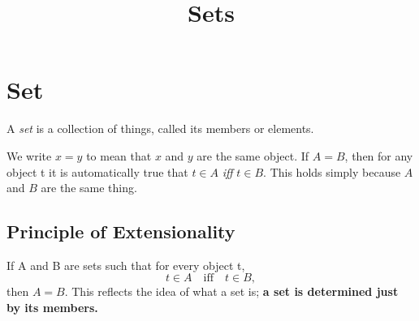 \documentclass[a4paper,12pt]{article}
\title{Sets}
\begin{document}
\section{Set} %
\label{sec:Set}

A \textit{set} is a collection of things, called its members or elements. \newline

We write $x = y$ to mean that $x$ and $y$ are the same object. If $A = B$, then for any object t it is automatically true that $t \in A$ \textit{iff} $t \in B$. This holds simply because $A$ and $B$ are the same thing.

\subsection{Principle of Extensionality} %
\label{sub:Principle of Extensionality}

If A and B are sets such that for every object t, $$t \in A \quad\textrm{iff}\quad t \in B,$$ then $A = B$. This reflects the idea of what a set is; \textbf{a set is determined just by its members.}


\end{document}
